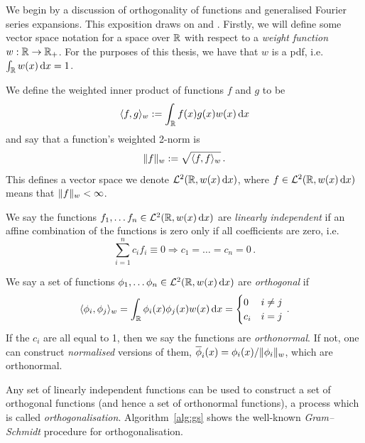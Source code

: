 We begin by a discussion of orthogonality of functions and generalised Fourier series expansions. This exposition draws on \cite{Szegoe1939} and \cite{gautschi2011numerical}. Firstly, we will define some vector space notation for a space over $\mathbb{R}$ with respect to a \emph{weight function} $w : \mathbb{R} \to \mathbb{R}_+$. For the purposes of this thesis, we have that $w$ is a pdf, i.e.\ $\int_{\mathbb{R}} w(x) \mathop{}\!\mathrm{d} x = 1$.

\begin{definition}
We define the weighted inner product of functions $f$ and $g$ to be
\[ \langle f, g \rangle_w := \int_{\mathbb{R}} f(x) g(x) w(x) \mathop{}\!\mathrm{d} x \]
and say that a function's weighted 2-norm is
\[ \lVert f\rVert_w := \sqrt{\langle f, f \rangle_w} \,. \]
This defines a vector space we denote $\mathcal{L}^2(\mathbb{R}, w(x) \mathop{}\!\mathrm{d} x)$, where $f \in \mathcal{L}^2(\mathbb{R}, w(x) \mathop{}\!\mathrm{d} x)$ means that $\lVert f\rVert_w < \infty$.
\end{definition}

\begin{definition}
We say the functions $f_1, \dots f_n \in \mathcal{L}^2(\mathbb{R}, w(x) \mathop{}\!\mathrm{d} x)$ are \emph{linearly independent} if an affine combination of the functions is zero only if all coefficients are zero, i.e.
\[ \sum_{i=1}^n c_i f_i \equiv 0 \Rightarrow c_1 = \dots = c_n = 0\,. \]
\end{definition}

\begin{definition} \label{def:orthogonal}
We say a set of functions $\phi_1, \dots \phi_n \in \mathcal{L}^2(\mathbb{R}, w(x) \mathop{}\!\mathrm{d} x)$ are \emph{orthogonal} if
\begin{equation} \label{orthogonality}
\langle \phi_i, \phi_j \rangle_w = \int_{\mathbb{R}} \phi_i(x) \phi_j(x) w(x) \mathop{}\!\mathrm{d} x =
\begin{cases}
	0 & i \not=j \\
	c_i & i = j
\end{cases} \,.
\end{equation}
If the $c_i$ are all equal to 1, then we say the functions are \emph{orthonormal}. If not, one can construct \emph{normalised} versions of them, $\overline{\phi}_i(x) = \phi_i(x)/\lVert \phi_i\rVert_w$, which are orthonormal.
\end{definition}

Any set of linearly independent functions can be used to construct a set of orthogonal functions (and hence a set of orthonormal functions), a process which is called \emph{orthogonalisation}. Algorithm~\ref{alg:gs} shows the well-known \emph{Gram--Schmidt} procedure for orthogonalisation.

